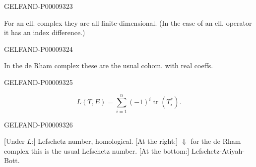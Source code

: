 \begin{GelfandAdjacentEvidence}{GELFAND-P000093}{23}

For an ell. complex they are all finite-dimensional.
(In the case of an ell. operator it has an index difference.)
\end{GelfandAdjacentEvidence}
\begin{GelfandAdjacentEvidence}{GELFAND-P000093}{24}

In the de Rham complex these are the usual cohom. with real coeffs.
\end{GelfandAdjacentEvidence}
\begin{GelfandAdjacentEvidence}{GELFAND-P000093}{25}

\begin{equation*}
L(T,E)=\sum_{i=1}^{n}(-1)^i\operatorname{tr}(T_i^*).
\end{equation*}
\end{GelfandAdjacentEvidence}
\begin{GelfandAdjacentEvidence}{GELFAND-P000093}{26}

[Under $L$:] Lefschetz number, homological.
[At the right:] $\Downarrow$ for the de Rham complex this is the usual Lefschetz number.
[At the bottom:] Lefschetz-Atiyah-Bott.
\end{GelfandAdjacentEvidence}




